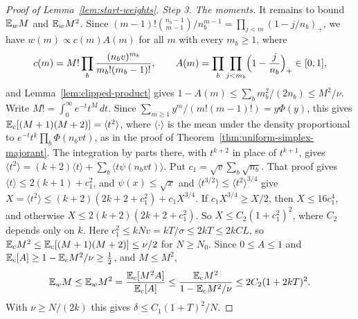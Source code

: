 \begin{proof}[Proof of Lemma~\ref{lem:start-weights}]
\emph{Step 3. The moments.} It remains to bound $\mathbb E_wM$ and $\mathbb E_wM^2$. Since
$(m-1)!\binom{n_b-1}{m-1}/n_b^{m-1}=\prod_{j<m}(1-j/n_b)_+$, we have
$w(m)\propto c(m)A(m)$ for all $m$ with every $m_b\ge1$, where
\[
 c(m)=M!\prod_b\frac{(n_bv)^{m_b}}{m_b!(m_b-1)!},\qquad
 A(m)=\prod_b\prod_{j<m_b}\Bigl(1-\frac j{n_b}\Bigr)_+\in[0,1],
\]
and Lemma~\ref{lem:clipped-product} gives $1-A(m)\le\sum_bm_b^2/(2n_b)\le M^2/\nu$.
Write $M!=\int_0^\infty e^{-t}t^M\,dt$. Since
$\sum_{m\ge1}y^m/(m!(m-1)!)=y\Phi(y)$, this gives
$\mathbb E_c[(M+1)(M+2)]=\langle t^2\rangle$, where $\langle\cdot\rangle$ is the mean
under the density proportional to $e^{-t}t^k\prod_b\Phi(n_bvt)$, as in the
proof of Theorem~\ref{thm:uniform-simplex-majorant}. The integration by parts
there, with $t^{k+2}$ in place of $t^{k+1}$, gives
$\langle t^2\rangle=(k+2)\langle t\rangle+\sum_b\langle t\psi(n_bvt)\rangle$. Put
$c_1=\sqrt v\sum_b\sqrt{n_b}$. That proof gives
$\langle t\rangle\le2(k+1)+c_1^2$, and $\psi(x)\le\sqrt x$ and
$\langle t^{3/2}\rangle\le\langle t^2\rangle^{3/4}$ give
$X=\langle t^2\rangle\le(k+2)(2k+2+c_1^2)+c_1X^{3/4}$. If $c_1X^{3/4}\ge X/2$,
then $X\le16c_1^4$, and otherwise $X\le2(k+2)(2k+2+c_1^2)$. So
$X\le C_2(1+c_1^2)^2$, where $C_2$ depends only on $k$. Here
$c_1^2\le kNv=kT/\sigma\le2kT\le2kCL$, so
$\mathbb E_cM^2\le\mathbb E_c[(M+1)(M+2)]\le\nu/2$ for $N\ge N_0$. Since $0\le A\le1$ and
$\mathbb E_c[A]\ge1-\mathbb E_cM^2/\nu\ge\frac12$, and $M\le M^2$,
\[
 \mathbb E_wM\le\mathbb E_wM^2=\frac{\mathbb E_c[M^2A]}{\mathbb E_c[A]}
 \le\frac{\mathbb E_cM^2}{1-\mathbb E_cM^2/\nu}\le2C_2(1+2kT)^2.
\]
With $\nu\ge N/(2k)$ this gives $\delta\le C_1(1+T)^2/N$.
\end{proof}

